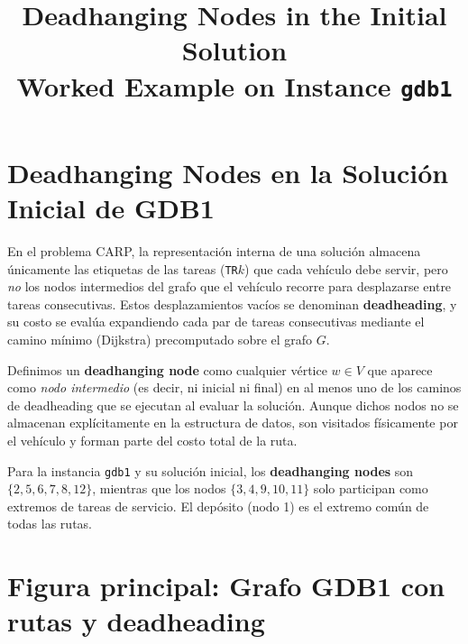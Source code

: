 \documentclass[12pt, a4paper]{article}
\title{Deadhanging Nodes in the Initial Solution\\
       \large Worked Example on Instance \texttt{gdb1}}
\author{}
\date{}
\begin{document}
\maketitle

\section{Deadhanging Nodes en la Solución Inicial de GDB1}

En el problema CARP, la representación interna de una solución almacena
únicamente las etiquetas de las tareas (\texttt{TR}$k$) que cada vehículo
debe servir, pero \emph{no} los nodos intermedios del grafo que el
vehículo recorre para desplazarse entre tareas consecutivas. Estos
desplazamientos vacíos se denominan \textbf{deadheading}, y su costo
se evalúa expandiendo cada par de tareas consecutivas mediante el
camino mínimo (Dijkstra) precomputado sobre el grafo $G$.

Definimos un \textbf{deadhanging node} como cualquier vértice
$w \in V$ que aparece como \emph{nodo intermedio} (es decir, ni inicial
ni final) en al menos uno de los caminos de deadheading que se
ejecutan al evaluar la solución. Aunque dichos nodos no se almacenan
explícitamente en la estructura de datos, son visitados físicamente
por el vehículo y forman parte del costo total de la ruta.

Para la instancia \texttt{gdb1} y su solución inicial,
los \textbf{deadhanging nodes} son
$\{2, 5, 6, 7, 8, 12\}$, mientras que los nodos
$\{3, 4, 9, 10, 11\}$ solo participan como extremos de tareas de
servicio. El depósito (nodo 1) es el extremo común de todas las rutas.

\section*{Figura principal: Grafo GDB1 con rutas y deadheading}
\end{document}
